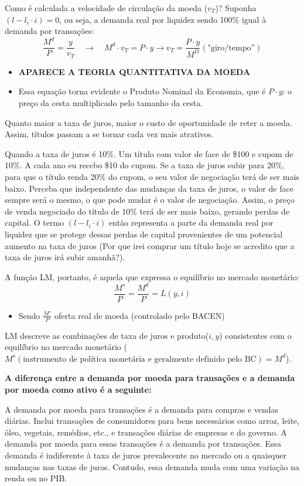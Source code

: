 \documentclass[a4paper,12pt]{article}[abntex2]
\begin{document}
Como é calculada a velocidade de circulação da moeda ($v_T$)? Suponha $(l - l_i \cdot i) = 0$, ou seja, a demanda real por liquidez sendo 100\% igual à demanda por transações:
\[
\frac{M^d}{P} = \frac{y}{v_T} \quad \rightarrow \quad M^d \cdot v_T = P \cdot y\rightarrow v_T=\frac{P \cdot y}{M^D} (\text{"giro/tempo''})
\]

\begin{itemize}
    \item \textbf{APARECE A TEORIA QUANTITATIVA DA MOEDA}
    \item Essa equação torna evidente o Produto Nominal da Economia, que é $P \cdot y$: o preço da cesta multiplicado pelo tamanho da cesta.
\end{itemize}

Quanto maior a taxa de juros, maior o custo de oportunidade de reter a moeda. Assim, títulos passam a se tornar cada vez mais atrativos.

Quando a taxa de juros é 10\%. Um título com valor de face de \$100 e cupom de 10\%. A cada ano eu recebo \$10 do cupom. Se a taxa de juros subir para 20\%, para que o título renda 20\% do cupom, o seu valor de negociação terá de ser mais baixo. Perceba que independente das mudanças da taxa de juros, o valor de face sempre será o mesmo, o que pode mudar é o valor de negociação. Assim, o preço de venda negociado do título de 10\% terá de ser mais baixo, gerando perdas de capital. O termo $(l - l_i \cdot i)$ então representa a parte da demanda real por liquidez que se protege dessas perdas de capital provenientes de um potencial aumento na taxa de juros (Por que irei comprar um título hoje se acredito que a taxa de juros irá subir amanhã?).

A função LM, portanto, é aquela que expressa o equilíbrio no mercado monetário:
\[
\frac{M^s}{P} = \frac{M^d}{P} = L(y, i)
\]

\begin{itemize}
    \item Sendo $\frac{M^s}{P}$ oferta real de moeda (controlado pelo BACEN)
\end{itemize}

LM descreve as combinações de taxa de juros e produto($i,y$) consistentes com o equilíbrio no mercado monetário ($M^s(\text{instrumento de política monetária e geralmente definido pelo BC}) = M^d$).

\textbf{A diferença entre a demanda por moeda para transações e a demanda por moeda como ativo é a seguinte:}

A demanda por moeda para transações é a demanda para compras e vendas diárias. Inclui transações de consumidores para bens necessários como arroz, leite, óleo, vegetais, remédios, etc., e transações diárias de empresas e do governo. A demanda por moeda para essas transações é a demanda por transações. Essa demanda é indiferente à taxa de juros prevalecente no mercado ou a quaisquer mudanças nas taxas de juros. Contudo, essa demanda muda com uma variação na renda ou no PIB.
\end{document}
